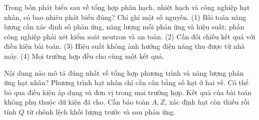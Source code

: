 \begin{ex}
Trong bốn phát biểu sau về tổng hợp phân hạch, nhiệt hạch và công nghiệp hạt nhân, có bao nhiêu phát biểu đúng? Chỉ ghi một số nguyên. (1) Bài toán năng lượng cần xác định số phản ứng, năng lượng mỗi phản ứng và hiệu suất; phần công nghiệp phải xét kiểm soát neutron và an toàn. (2) Cần đối chiếu kết quả với điều kiện bài toán. (3) Hiệu suất không ảnh hưởng điện năng thu được từ nhà máy. (4) Mọi trường hợp đều cho cùng một kết quả.
\end{ex}

\begin{ex}
Nội dung nào mô tả đúng nhất về tổng hợp phương trình và năng lượng phản ứng hạt nhân?
\choice
{Phương trình hạt nhân chỉ cần cân bằng số hạt ở hai vế.}
{Có thể bỏ qua điều kiện áp dụng và đơn vị trong mọi trường hợp.}
{Kết quả của bài toán không phụ thuộc dữ kiện đã cho.}
{\True Cần bảo toàn $A,Z$, xác định hạt còn thiếu rồi tính $Q$ từ chênh lệch khối lượng trước và sau phản ứng.}
\end{ex}

